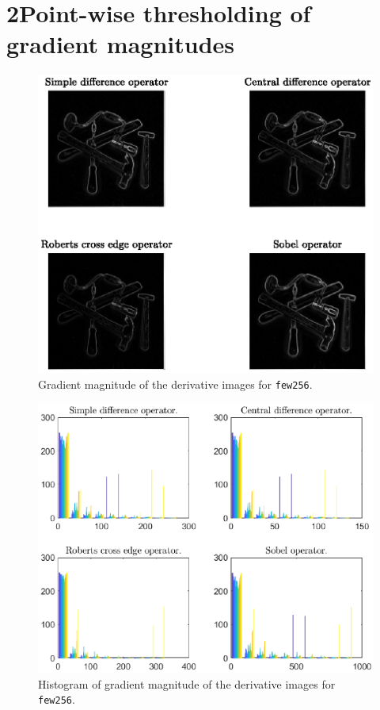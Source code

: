 \documentclass[11pt,a4paper]{article}
\begin{document}
\section*{2\hspace{0.5cm}Point-wise thresholding of gradient magnitudes}
	\begin{figure}[!ht]
		\centering
		\includegraphics[width=0.9\columnwidth]{Question_2_Tools_Gradient_Magnitude.eps}
		\caption{Gradient magnitude of the derivative images for \texttt{few256}.}
		\label{fig:Question_2_Tools_Gradient_Magnitude}
	\end{figure}
	\begin{figure}[!ht]
		\centering
		\includegraphics[width=0.9\columnwidth]{Question_2_Tools_Hist.eps}
		\caption{Histogram of gradient magnitude of the derivative images for \texttt{few256}.}
		\label{fig:Question_2_Tools_Hist}
	\end{figure}
\end{document}
